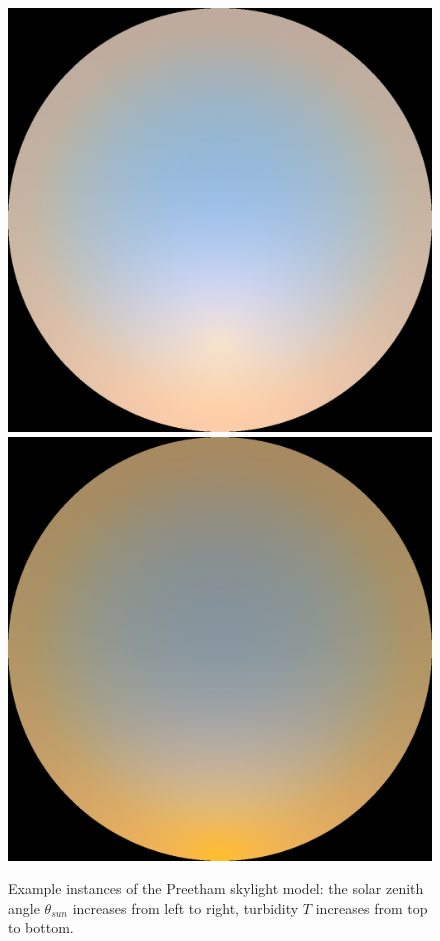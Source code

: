 \begin{figure}
{ }
 \hfill
 \subtop
 {
 \includegraphics[scale=0.125]{figures/preetham_sRGB_D65_turbidity_6_thetaSun_60.png}
 }
 \hfill
 \subtop
 {
 \includegraphics[scale=0.125]{figures/preetham_sRGB_D65_turbidity_6_thetaSun_90.png}
 }
\caption[Example instances of the Preetham skylight model.]{
Example instances of the Preetham skylight model: the solar zenith angle
$\theta_{sun}$ increases from left to right, turbidity $T$ increases from top
to bottom.
}
\label{fig:preetham}
\end{figure}
